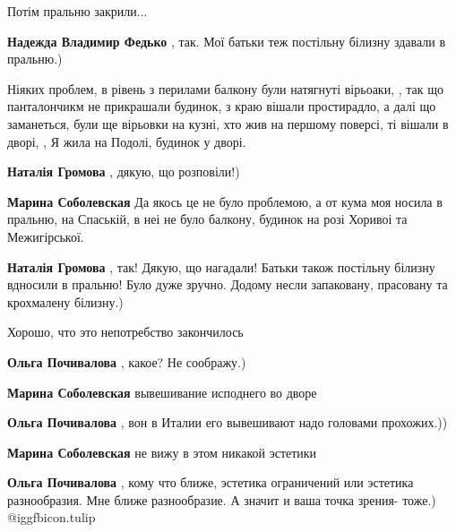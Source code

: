 \begin{itemize}
Потім пральню закрили...

\textbf{Надежда Владимир Федько} , так. Мої батьки теж постільну білизну здавали в пральню.)


Ніяких проблем, в рівень з перилами балкону були натягнуті вірьоаки, , так що
панталончикм не прикрашали будинок, з краю вішали простирадло, а далі що
заманеться, були ще вірьовки на кузні, хто жив на першому поверсі, ті вішали в
дворі, , Я жила на Подолі, будинок у дворі.

\begin{itemize} %
\textbf{Наталія Громова} , дякую, що розповіли!)

\textbf{Марина Соболевская} Да якось це не було проблемою, а от кума моя носила в пральню, на Спаській, в неі не було балкону, будинок на розі Хоривоі та Межигірської.

\textbf{Наталія Громова} , так! Дякую, що нагадали! Батьки також постільну білизну вдносили в пральню! Було дуже зручно. Додому несли запаковану, прасовану та крохмалену білизну.)
\end{itemize} %

Хорошо, что это непотребство закончилось

\begin{itemize} %
\textbf{Ольга Почивалова} , какое? Не соображу.)

\textbf{Марина Соболевская} вывешивание исподнего во дворе

\textbf{Ольга Почивалова} , вон в Италии его вывешивают надо головами прохожих.))

\textbf{Марина Соболевская} не вижу в этом никакой эстетики

\textbf{Ольга Почивалова} , кому что ближе, эстетика ограничений или эстетика разнообразия. Мне ближе разнообразие. А значит и ваша точка зрения- тоже.)  @igg{fbicon.tulip} 

\end{itemize} %

\end{itemize} %
